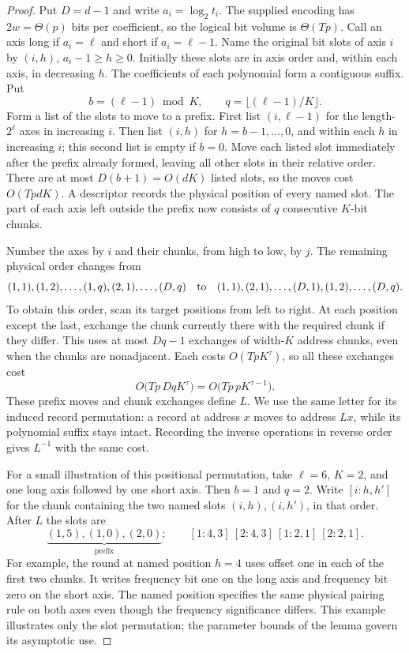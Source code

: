 \begin{proof}
Put $D=d-1$ and write $a_i=\log_2t_i$. The supplied encoding has
$2w=\Theta(p)$ bits per coefficient, so the logical bit volume is
$\Theta(Tp)$.  Call an axis long if $a_i=\ell$ and short if
$a_i=\ell-1$.  Name the original bit slots of axis $i$ by
$(i,h)$, $a_i-1\geq h\geq0$.  Initially these slots are in axis order
and, within each axis, in decreasing $h$.  The coefficients of each
polynomial form a contiguous suffix.  Put
\[
       b=(\ell-1)\bmod K,
       \qquad q=\lfloor(\ell-1)/K\rfloor.
\]
Form a list of the slots to move to a prefix.  First list
$(i,\ell-1)$ for the length-$2^\ell$ axes in increasing $i$.
Then list $(i,h)$ for $h=b-1,\ldots,0$, and within each $h$ in
increasing $i$; this second list is empty if $b=0$.  Move each listed
slot immediately after the prefix already formed, leaving all other
slots in their relative order.  There are at most $D(b+1)=O(dK)$
listed slots, so the moves cost $O(TpdK)$.  A descriptor records the
physical position of every named slot.  The part of each axis left
outside the prefix now consists of $q$ consecutive $K$-bit chunks.

Number the axes by $i$ and their chunks, from high to low, by $j$.
The remaining physical order changes from
\[
 (1,1),(1,2),\ldots,(1,q),(2,1),\ldots,(D,q)
 \quad\hbox{to}\quad
 (1,1),(2,1),\ldots,(D,1),(1,2),\ldots,(D,q).
\]
To obtain this order, scan its target positions from left to right.
At each position except the last, exchange the chunk currently there
with the required chunk if they differ.  This uses at most $Dq-1$
exchanges of width-$K$ address chunks, even when the chunks are
nonadjacent.  Each costs $O(TpK^\tau)$, so all these exchanges cost
\[
 O\bigl(Tp\,DqK^\tau\bigr)
       =O\bigl(Tp\,pK^{\tau-1}\bigr).
\]
These prefix moves and chunk exchanges define $L$.  We use the same
letter for its induced record permutation: a record at address $x$
moves to address $Lx$, while its polynomial suffix stays intact.
Recording the inverse operations in reverse order gives $L^{-1}$
with the same cost.

For a small illustration of this positional permutation, take
$\ell=6$, $K=2$, and one long axis followed by one short axis.
Then $b=1$ and $q=2$. Write $[i:h,h']$ for the chunk containing
the two named slots $(i,h),(i,h')$, in that order. After $L$ the slots are
\[
 \underbrace{(1,5),(1,0),(2,0)}_{\text{prefix}} ;\qquad
 [1:4,3]\ [2:4,3]\ [1:2,1]\ [2:2,1].
\]
For example, the round at named position $h=4$ uses offset one in
each of the first two chunks. It writes frequency bit one on the long
axis and frequency bit zero on the short axis. The named position
specifies the same physical pairing rule on both axes even though the
frequency significance differs. This example illustrates only the slot
permutation; the parameter bounds of the lemma govern its asymptotic use.


\end{proof}
